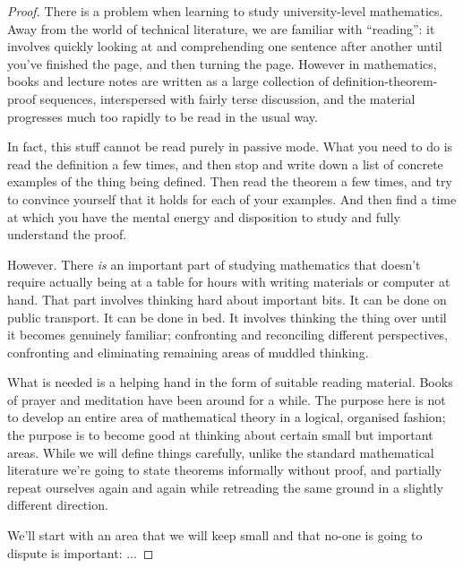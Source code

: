 \begin{proof}
There is a problem when learning to study university-level mathematics. Away from the world of
technical literature, we are familiar with ``reading'': it involves quickly looking at and
comprehending one sentence after another until you've finished the page, and then turning the
page. However in mathematics, books and lecture notes are written as a large collection of
definition-theorem-proof sequences, interspersed with fairly terse discussion, and the material
progresses much too rapidly to be read in the usual way.

In fact, this stuff cannot be read purely in passive mode.  What you need to do is read the
definition a few times, and then stop and write down a list of concrete examples of the thing being
defined. Then read the theorem a few times, and try to convince yourself that it holds for each of
your examples. And then find a time at which you have the mental energy and disposition to study
and fully understand the proof.

However. There {\it is} an important part of studying mathematics that doesn't require actually
being at a table for hours with writing materials or computer at hand. That part involves thinking
hard about important bits. It can be done on public transport. It can be done in bed. It involves
thinking the thing over until it becomes genuinely familiar; confronting and reconciling different
perspectives, confronting and eliminating remaining areas of muddled thinking.

What is needed is a helping hand in the form of suitable reading material. Books of prayer and
meditation have been around for a while.  The purpose here is not to develop an entire area of
mathematical theory in a logical, organised fashion; the purpose is to become good at thinking
about certain small but important areas. While we will define things carefully, unlike the standard
mathematical literature we're going to state theorems informally without proof, and partially
repeat ourselves again and again while retreading the same ground in a slightly different
direction.

We'll start with an area that we will keep small and that no-one is going to dispute is important:
...



\end{proof}
